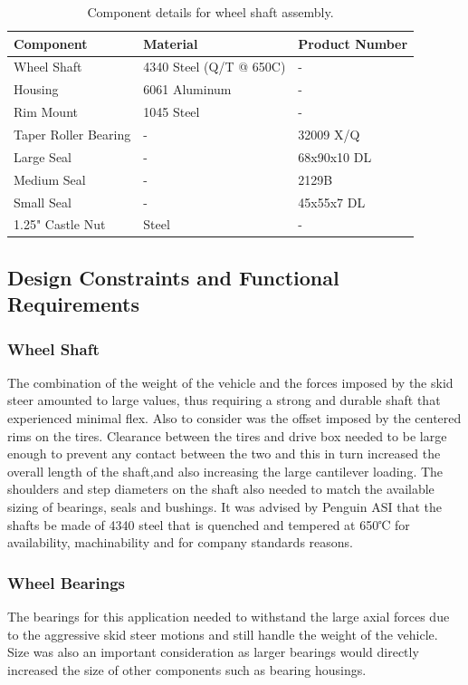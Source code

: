 \begin{table}[htbp]
	\centering
	\caption{Component details for wheel shaft assembly.}
	\begin{tabular}{| lll |} \hline
		Component & Material & Product Number \\ \hline
		Wheel Shaft & 4340 Steel (Q/T @ 650\degree C) & - \\
		Housing & 6061 Aluminum & - \\
		Rim Mount & 1045 Steel & - \\
		Taper Roller Bearing & - & 32009 X/Q \\
		Large Seal & - & 68x90x10 DL \\
		Medium Seal & - & 2129B \\
		Small Seal & - & 45x55x7 DL \\
		1.25" Castle Nut & Steel & - \\ \hline
	\end{tabular}
	\label{tab:design_spec}
\end{table}


\subsection{Design Constraints and Functional Requirements}
\subsubsection{Wheel Shaft}
The combination of the weight of the vehicle and the forces imposed by the skid steer amounted to large values, thus requiring a strong and durable shaft that experienced minimal flex. Also to consider was the offset imposed by the centered rims on the tires. Clearance between the tires and drive box needed to be large enough to prevent any contact between the two and this in turn increased the overall length of the shaft,and also increasing the large cantilever loading. The shoulders and step diameters on the shaft also needed to match the available sizing of bearings, seals and bushings. It was advised by Penguin ASI that the shafts be made of 4340 steel that is quenched and tempered at 650℃ for availability, machinability and for company standards reasons.

\subsubsection{Wheel Bearings}
The bearings for this application needed to withstand the large axial forces due to the aggressive skid steer motions and still handle the weight of the vehicle. Size was also an important consideration as larger bearings would directly increased the size of other components such as bearing housings.

